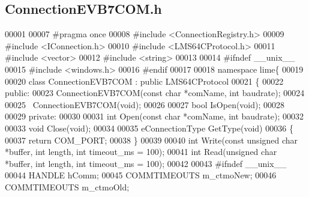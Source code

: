 \subsection{Connection\+E\+V\+B7\+C\+O\+M.\+h}
\label{ConnectionEVB7COM_8h_source}

\begin{DoxyCode}
00001 
00007 \textcolor{preprocessor}{#pragma once}
00008 \textcolor{preprocessor}{#include <ConnectionRegistry.h>}
00009 \textcolor{preprocessor}{#include <IConnection.h>}
00010 \textcolor{preprocessor}{#include <LMS64CProtocol.h>}
00011 \textcolor{preprocessor}{#include <vector>}
00012 \textcolor{preprocessor}{#include <string>}
00013 
00014 \textcolor{preprocessor}{#ifndef \_\_unix\_\_}
00015 \textcolor{preprocessor}{    #include <windows.h>}
00016 \textcolor{preprocessor}{#endif}
00017 
00018 \textcolor{keyword}{namespace }lime\{
00019 
00020 \textcolor{keyword}{class }ConnectionEVB7COM : \textcolor{keyword}{public} LMS64CProtocol
00021 \{
00022 \textcolor{keyword}{public}:
00023     ConnectionEVB7COM(\textcolor{keyword}{const} \textcolor{keywordtype}{char} *comName, \textcolor{keywordtype}{int} baudrate);
00024 
00025     ~ConnectionEVB7COM(\textcolor{keywordtype}{void});
00026 
00027     \textcolor{keywordtype}{bool} IsOpen(\textcolor{keywordtype}{void});
00028 
00029 \textcolor{keyword}{private}:
00030 
00031     \textcolor{keywordtype}{int} Open(\textcolor{keyword}{const} \textcolor{keywordtype}{char} *comName, \textcolor{keywordtype}{int} baudrate);
00032 
00033     \textcolor{keywordtype}{void} Close(\textcolor{keywordtype}{void});
00034 
00035     eConnectionType GetType(\textcolor{keywordtype}{void})
00036     \{
00037         \textcolor{keywordflow}{return} COM_PORT;
00038     \}
00039 
00040     \textcolor{keywordtype}{int} Write(\textcolor{keyword}{const} \textcolor{keywordtype}{unsigned} \textcolor{keywordtype}{char} *buffer, \textcolor{keywordtype}{int} length, \textcolor{keywordtype}{int} timeout_ms = 100);
00041     \textcolor{keywordtype}{int} Read(\textcolor{keywordtype}{unsigned} \textcolor{keywordtype}{char} *buffer, \textcolor{keywordtype}{int} length, \textcolor{keywordtype}{int} timeout_ms = 100);
00042 
00043 \textcolor{preprocessor}{    #ifndef \_\_unix\_\_}
00044         HANDLE hComm;
00045         COMMTIMEOUTS m_ctmoNew;
00046         COMMTIMEOUTS m_ctmoOld;

\end{DoxyCode}
